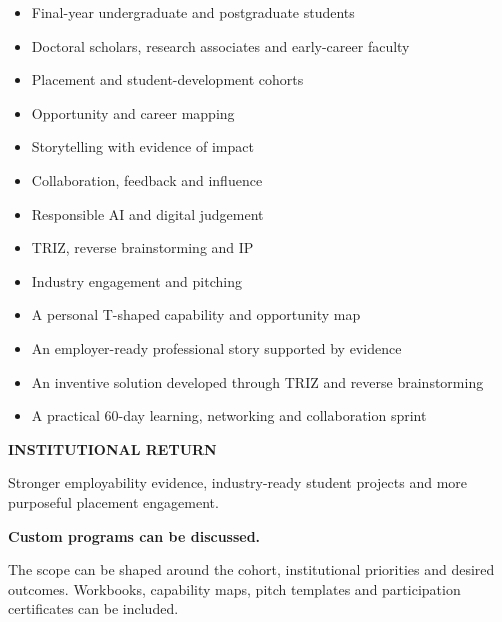 \begin{minipage}[t]{0.36\textwidth}
  \vspace{0pt}
  \begin{brochurecard}[colback=Accent!5!white]
    \begin{itemize}
      \item Final-year undergraduate and postgraduate students
      \item Doctoral scholars, research associates and early-career faculty
      \item Placement and student-development cohorts
    \end{itemize}
  \end{brochurecard}

  \begin{brochurecard}
    \begin{itemize}
      \item Opportunity and career mapping
      \item Storytelling with evidence of impact
      \item Collaboration, feedback and influence
      \item Responsible AI and digital judgement
      \item TRIZ, reverse brainstorming and IP
      \item Industry engagement and pitching
    \end{itemize}
  \end{brochurecard}

  \begin{brochurecard}[colback=Accent!3!white]
    \begin{itemize}
      \item A personal T-shaped capability and opportunity map
      \item An employer-ready professional story supported by evidence
      \item An inventive solution developed through TRIZ and reverse brainstorming
      \item A practical 60-day learning, networking and collaboration sprint
    \end{itemize}
    {\color{Accent}\bfseries\fontsize{6.6}{7.2}\selectfont INSTITUTIONAL RETURN}\par
    Stronger employability evidence, industry-ready student projects and more purposeful placement engagement.
  \end{brochurecard}

  \begin{customprogramcard}
    {\bfseries Custom programs can be discussed.}\par
    The scope can be shaped around the cohort, institutional priorities and desired outcomes.
    Workbooks, capability maps, pitch templates and participation certificates can be included.
  \end{customprogramcard}
\end{minipage}

\Footer
